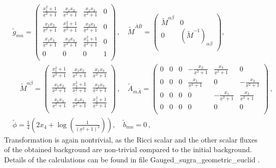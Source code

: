 \documentclass[12pt, utf8]{article}
\numberwithin{equation}{section}
\begin{document}
\begin{equation}
    \begin{aligned}
    &    \tilde{g}_{m n} = \left(
\begin{array}{cccc}
 \frac{x_1^2+1}{\underline{x}^2+1} & \frac{x_1 x_2}{\underline{x}^2+1} & \frac{x_1 x_3}{\underline{x}^2+1} & 0 \\
 \frac{x_1 x_2}{\underline{x}^2+1} & \frac{x_2^2+1}{\underline{x}^2+1} & \frac{x_2 x_3}{\underline{x}^2+1} & 0 \\
 \frac{x_1 x_3}{\underline{x}^2+1} & \frac{x_2 x_3}{\underline{x}^2+1} & \frac{x_3^2+1}{\underline{x}^2+1} & 0 \\
 0 & 0 & 0 & 1 \\
\end{array}
\right) \, , \quad \tilde{M}^{\bar{A}\bar{B}} = 
\left(
\begin{array}{cc}
 \tilde{M}^{\alpha \beta} & 0  \\
 0 & (\tilde{M}^{-1})_{\alpha \beta} \\
\end{array}
\right), \\
& \quad \tilde{M}^{\alpha \beta} = 
\left(
\begin{array}{ccc}
 \frac{x_1^2+1}{\underline{x}^2+1} & \frac{x_1 x_2}{\underline{x}^2+1} & \frac{x_1 x_3}{\underline{x}^2+1} \\
 \frac{x_1 x_2}{\underline{x}^2+1} & \frac{x_2^2+1}{\underline{x}^2+1} & \frac{x_2 x_3}{\underline{x}^2+1} \\
 \frac{x_1 x_3}{\underline{x}^2+1} & \frac{x_2 x_3}{\underline{x}^2+1} & \frac{x_3^2+1}{\underline{x}^2+1} \\
\end{array}
\right)
 \, , \quad
 \tilde{A}_{m \bar{A}} = \left(
\begin{array}{cccccc}
 0 & 0 & 0 & -\frac{x_2}{\underline{x}^2+1} & \frac{x_3}{\underline{x}^2+1} & 0 \\
 0 & 0 & 0 & \frac{x_1}{\underline{x}^2+1} & 0 & -\frac{x_3}{\underline{x}^2+1} \\
 0 & 0 & 0 & 0 & -\frac{x_1}{\underline{x}^2+1} & \frac{x_2}{\underline{x}^2+1} \\
 0 & 0 & 0 & 0 & 0 & 0 \\
\end{array}
\right)\, ,\\
& \tilde{\phi} = \frac{1}{4} \left(2 x_4+\log \left(\frac{1}{\left(\underline{x}^2+1\right)^2}\right)\right), \quad \tilde{b}_{mn} = 0 \, , 
    \end{aligned}
\end{equation}
Transformation is again nontrivial, as the Ricci scalar and the other scalar fluxes of the obtained background are non-trivial compared to the initial background. Details of the calculations can be found in file Gauged\_sugra\_geometric\_euclid \cite{Gubarev:2025nonabelianuni}.
\end{document}
